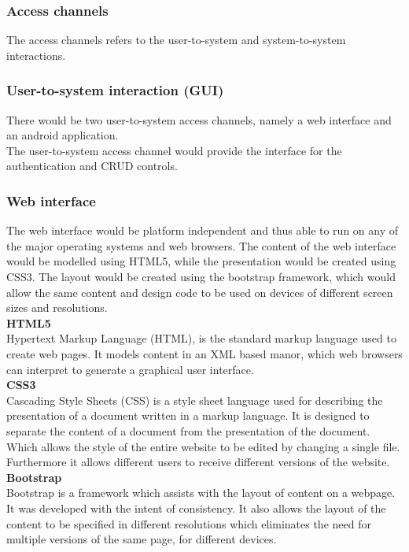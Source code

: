 \documentclass{article}
\begin{document}
\subsubsection{Access channels}
The access channels refers to the user-to-system and system-to-system interactions. 
\subsubsection*{User-to-system interaction (GUI)}
There would be two user-to-system access channels, namely a web interface and an android application.\\ 
The user-to-system access channel would provide the interface for the authentication and CRUD controls.

\subsubsection*{Web interface}
The web interface would be platform independent and thus able to run on any of the major operating systems and web browsers. The content of the web interface would be modelled using HTML5, while the presentation would be created using CSS3. The layout would be created using the bootstrap framework, which would allow the same content and design code to be used on devices of different screen sizes and resolutions. \\
\textbf{HTML5}\\
Hypertext Markup Language (HTML), is the standard markup language used to create web pages. It models content in an XML based manor, which web browsers can interpret to generate a graphical user interface.\\
\textbf{CSS3}\\
Cascading Style Sheets (CSS) is a style sheet language used for describing the presentation of a document written in a markup language. It is designed to separate the content of a document from the presentation of the document. Which allows the style of the entire website to be edited by changing a single file. Furthermore it allows different users to receive different versions of the website.\\
\textbf{Bootstrap}\\
Bootstrap is a framework which assists with the layout of content on a webpage. It was developed with the intent of consistency. It also allows the layout of the content to be specified in different resolutions which eliminates the need for multiple versions of the same page, for different devices.
\end{document}
